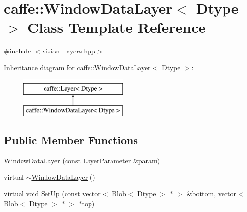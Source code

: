 \hypertarget{classcaffe_1_1_window_data_layer}{\section{caffe\+:\+:Window\+Data\+Layer$<$ Dtype $>$ Class Template Reference}
\label{classcaffe_1_1_window_data_layer}
}


{\ttfamily \#include $<$vision\+\_\+layers.\+hpp$>$}

Inheritance diagram for caffe\+:\+:Window\+Data\+Layer$<$ Dtype $>$\+:\begin{figure}[H]
\begin{center}
\leavevmode
\includegraphics[height=2.000000cm]{classcaffe_1_1_window_data_layer}
\end{center}
\end{figure}
\subsection*{Public Member Functions}
\begin{DoxyCompactItemize}
\item 
\hyperlink{classcaffe_1_1_window_data_layer_a747fce6a6cfc2bcc05f9422d8b1cba97}{Window\+Data\+Layer} (const Layer\+Parameter \&param)
\item 
virtual \hyperlink{classcaffe_1_1_window_data_layer_ae2780e115ce5d68a5227979a693ff30e}{$\sim$\+Window\+Data\+Layer} ()
\item 
virtual void \hyperlink{classcaffe_1_1_window_data_layer_a9fe034abb37141b76180edd2002a095b}{Set\+Up} (const vector$<$ \hyperlink{classcaffe_1_1_blob}{Blob}$<$ Dtype $>$ $\ast$ $>$ \&bottom, vector$<$ \hyperlink{classcaffe_1_1_blob}{Blob}$<$ Dtype $>$ $\ast$ $>$ $\ast$top)
\end{DoxyCompactItemize}
